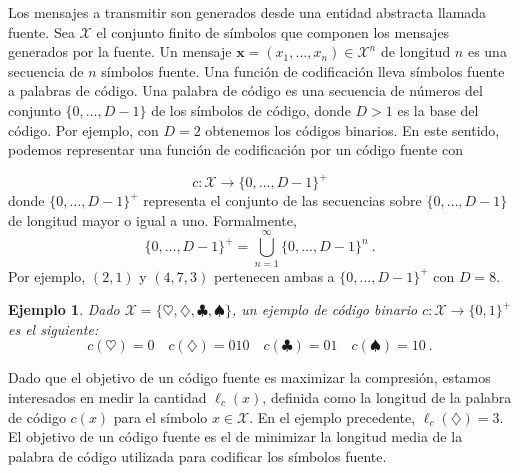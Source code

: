 \documentclass[11pt]{article}
\newtheorem{example}[theorem]{Ejemplo}
\newcommand{\bx}{ \boldsymbol{x} }
\newcommand{\scX}{\mathcal{X}}
\begin{document}
\begin{center}
\end{center}

\bigskip

Los mensajes a transmitir son generados desde una entidad abstracta llamada fuente. Sea $\scX$ el conjunto finito de símbolos que componen los mensajes generados por la fuente. Un mensaje $\bx = (x_1,\dots,x_n) \in \scX^n$ de longitud $n$ es una secuencia de $n$ símbolos fuente. Una función de codificación lleva símbolos fuente a palabras de código. Una palabra de código es una secuencia de números del conjunto $\{0,\dots,D-1\}$ de los símbolos de código, donde $D > 1$ es la base del código. Por ejemplo, con $D=2$ obtenemos los códigos binarios. En este sentido, podemos representar una función de codificación por un código fuente con

\[
    c : \scX \to \{0,\dots,D-1\}^+
\]
donde $\{0,\dots,D-1\}^+$ representa el conjunto de las secuencias sobre $\{0,\dots,D-1\}$ de longitud mayor o igual a uno. Formalmente,
\[
    \{0,\dots,D-1\}^+ = \bigcup_{n=1}^{\infty} \{0,\dots,D-1\}^n~.
\]
Por ejemplo, $(2,1)$ y $(4,7,3)$ pertenecen ambas a $\{0,\dots,D-1\}^+$ con $D=8$.
%
\begin{example}
\label{ex:1}
Dado $\scX = \{\heartsuit,\diamondsuit,\clubsuit,\spadesuit\}$, un ejemplo de código binario $c : \scX\to\{0,1\}^+$ es el siguiente:
\[
    c(\heartsuit) = 0 \quad c(\diamondsuit) = 010 \quad c(\clubsuit) = 01 \quad c(\spadesuit) = 10~.
\]
\end{example}
%
Dado que el objetivo de un código fuente es maximizar la compresión, estamos interesados en medir la cantidad $\ell_c(x)$, definida como la longitud de la palabra de código $c(x)$ para el símbolo $x\in\scX$. En el ejemplo precedente, $\ell_c(\diamondsuit) = 3$.
El objetivo de un código fuente es el de minimizar la longitud media de la palabra de código utilizada para codificar los símbolos fuente.
\end{document}
